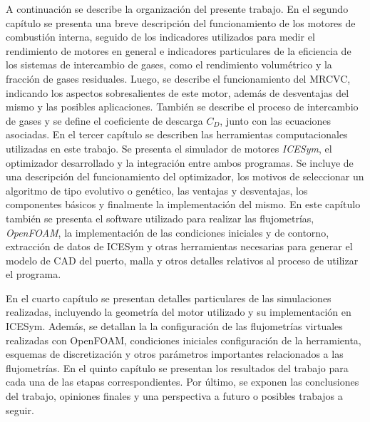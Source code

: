 %
A continuación se describe la organización del presente trabajo.
%
%
En el segundo capítulo se presenta una breve descripción del funcionamiento de
los motores de combustión interna, seguido de los indicadores utilizados para
medir el rendimiento de motores en general e indicadores particulares de la
eficiencia de los sistemas de intercambio de gases, como el rendimiento
volumétrico y la fracción de gases residuales.
%
Luego, se describe el funcionamiento del MRCVC, indicando los aspectos
sobresalientes de este motor, además de desventajas del mismo y las posibles
aplicaciones.
%
También se describe el proceso de intercambio de gases y se define el
coeficiente de descarga $C_{D}$, junto con las ecuaciones asociadas.
%
%
En el tercer capítulo se describen las herramientas computacionales utilizadas
en este trabajo.
%
Se presenta el simulador de motores \emph{ICESym}, el optimizador desarrollado y
la integración entre ambos programas.
%
Se incluye de una descripción del funcionamiento del optimizador, los motivos de
seleccionar un algoritmo de tipo evolutivo o genético, las ventajas y
desventajas, los componentes básicos y finalmente la implementación del mismo.
%
En este capítulo también se presenta el software utilizado para realizar las
flujometrías, \emph{OpenFOAM}, la implementación de las condiciones iniciales y
de contorno, extracción de datos de ICESym y otras herramientas necesarias para
generar el modelo de CAD del puerto, malla y otros detalles relativos al proceso
de utilizar el programa.

%
En el cuarto capítulo se presentan detalles particulares de las simulaciones
realizadas, incluyendo la geometría del motor utilizado y su implementación en
ICESym.
%
Además, se detallan la la configuración de las flujometrías virtuales realizadas
con OpenFOAM, condiciones iniciales configuración de la herramienta, esquemas de
discretización y otros parámetros importantes relacionados a las flujometrías.
%
%
En el quinto capítulo se presentan los resultados del trabajo para cada una de
las etapas correspondientes.
%
%
Por último, se exponen las conclusiones del trabajo, opiniones finales y una
perspectiva a futuro o posibles trabajos a seguir.
